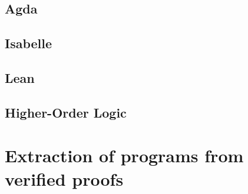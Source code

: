 \subsection{Agda}

\subsection{Isabelle}

\subsection{Lean}

\subsection{Higher-Order Logic}

\section{Extraction of programs from verified proofs}
